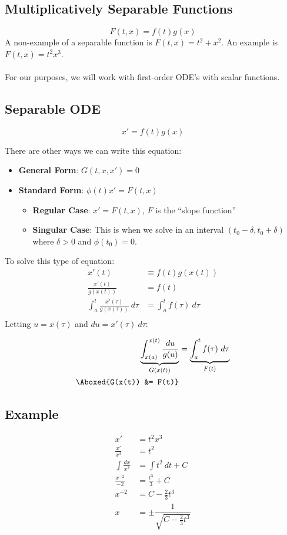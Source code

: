 \documentclass[12pt]{article}
\begin{document}
\subsection{Multiplicatively Separable Functions}
\[ F(t,x) = f(t)g(x) \]
A non-example of a separable function is $F(t,x) = t^2 + x^2$. An example is $F(t,x) = t^2x^3$. \\ \\ 
For our purposes, we will work with first-order ODE's with scalar functions.

\subsection{Separable ODE}
\[ \boxed{x' = f(t)g(x)} \]

There are other ways we can write this equation:
\begin{itemize}
\item \textbf{General Form}: $G(t,x,x') = 0$
\item \textbf{Standard Form}: $\phi(t)x' = F(t,x)$
\begin{itemize}
\item \textbf{Regular Case}: $x' = F(t,x)$, $F$ is the ``slope function''
\item \textbf{Singular Case}: This is when we solve in an interval $(t_0 - \delta, t_0 + \delta)$ where $\delta > 0$ and $\phi(t_0) = 0$.
\end{itemize}
\end{itemize}

To solve this type of equation:
\[
\begin{aligned}
x'(t) &\equiv f(t)g(x(t)) \\
\frac{x'(t)}{g(x(t))} &= f(t) \\
\int_a^t \frac{x'(\tau)}{g(x(\tau))} \ d\tau &= \int_a^t f(\tau) \ d\tau \\
\end{aligned}
\]
Letting $u = x(\tau)$ and $du = x'(\tau) \ d\tau$:

\[
\begin{aligned}
\underbrace{\int_{x(a)}^{x(t)}\frac{du}{g(u)}}_{G(x(t))} &= \underbrace{\int_a^t f(\tau) \ d\tau}_{F(t)} \\
\Aboxed{G(x(t)) &= F(t)}
\end{aligned}
\]

\subsection{Example}
\[ 
\begin{aligned}
x' &= t^2x^3 \\
\frac{x'}{x^3} &= t^2 \\
\int \frac{dx}{x^3} &= \int t^2 \ dt + C \\
\frac{x^{-2}}{-2} &= \frac{t^3}{3} + C \\
x^{-2} &= C - \frac{2}{3}t^3 \\
x &= \pm \dfrac{1}{\sqrt{C - \frac{2}{3}t^3}}
\end{aligned}
\]
\end{document}
